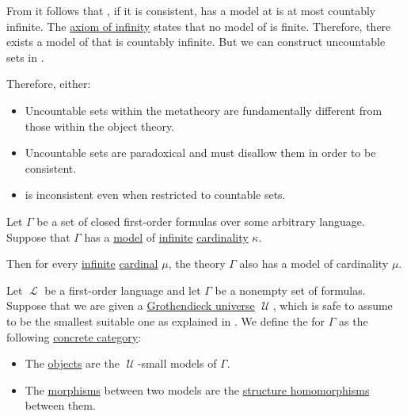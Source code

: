 \begin{example}\label{ex:skolems_paradox}
  From  it follows that \hyperref[def:zfc]{}, if it is consistent, has a model at is at most countably infinite. The \hyperref[def:zfc/infinity]{axiom of infinity} states that no model of  is finite. Therefore, there exists a model of  that is countably infinite. But we can construct uncountable sets in .

  Therefore, either:
  \begin{itemize}
    \item Uncountable sets within the metatheory are fundamentally different from those within the object theory.
    \item Uncountable sets are paradoxical and  must disallow them in order to be consistent.
    \item {} is inconsistent even when restricted to countable sets.
  \end{itemize}
\end{example}

\begin{theorem}\label{thm:upward_lowenheim_skolem_theorem}
  Let \( \Gamma \) be a set of closed first-order formulas over some arbitrary language. Suppose that \( \Gamma \) has a \hyperref[def:first_order_model]{model} of \hyperref[def:set_finiteness]{infinite} \hyperref[thm:cardinality_existence]{cardinality} \( \kappa \).

  Then for every \hyperref[def:set_finiteness]{infinite} \hyperref[def:cardinal]{cardinal} \( \mu \), the theory \( \Gamma \) also has a model of cardinality \( \mu \).
\end{theorem}

\begin{definition}\label{def:category_of_small_first_order_models}\mimprovised
  Let \( \mscrL \) be a first-order language and let \( \Gamma \) be a nonempty set of formulas. Suppose that we are given a \hyperref[def:grothendieck_universe]{Grothendieck universe} \( \mscrU \), which is safe to assume to be the smallest suitable one as explained in . We define the  for \( \Gamma \) as the following \hyperref[rem:concrete_categories]{concrete category}:

  \begin{itemize}
    \item The \hyperref[def:category/objects]{objects} are the \( \mscrU \)-small models of \( \Gamma \).

    \item The \hyperref[def:category/morphisms]{morphisms} between two models are the \hyperref[def:first_order_homomorphism]{structure homomorphisms} between them.
  \end{itemize}
\end{definition}

